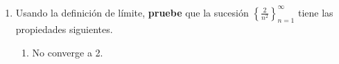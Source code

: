 \documentclass[12pt]{article}
\begin{document}
\begin{enumerate}
\begin{proof}
\begin{enumerate}
\begin{equation*}
                    1^2+2^2+\cdots+n^2=\frac{n(n+1)(2n+1)}{2}
                \end{equation*}
                de esta forma
                \begin{equation*}
                    \frac{1^2+2^2+\cdots+n^2}{n^3}=\frac{n(n+1)(2n+1)}{2n^3}
                \end{equation*}
                reescribiendo de forma apropiada se obtiene que
                \begin{equation*}
                    \begin{split}
                        \frac{n(n+1)(2n+1)}{2n^3}=&\frac{n(2n^2+3n+1)}{2n^3}\\
                        =&\frac{2n^3+3n^2+n}{2n^3}\\
                        =&1+\frac{3}{2n}+\frac{1}{2n^2}\\
                        =&1+\frac{3}{2}\cdot\frac{1}{n}+\frac{1}{2}\cdot\frac{1}{n^2}\\
                    \end{split}
                \end{equation*}
                por tanto
                \begin{equation*}
                    \begin{split}
                        \lim_{n\rightarrow\infty}\frac{1^2+2^2+\cdots+n^2}{n^3}=&\lim_{n\rightarrow\infty}\left(1+\frac{3}{2}\cdot\frac{1}{n}+\frac{1}{2}\cdot\frac{1}{n^2}\right)\\
                        =&\lim_{n\rightarrow\infty}1+\lim_{n\rightarrow\infty}\frac{3}{2}\cdot\frac{1}{n}+\lim_{n\rightarrow\infty}\frac{1}{2}\cdot\frac{1}{n^2}\\
                        =&1+\frac{3}{2}\cdot\lim_{n\rightarrow\infty}\frac{1}{n}+\frac{1}{2}\cdot\lim_{n\rightarrow\infty}\frac{1}{n^2}\\
                        =&1\\
                    \end{split}
                \end{equation*}
                \item 
                \qed
            \end{enumerate}
        \end{proof}
    \item Usando la definición de límite, \textbf{pruebe} que la sucesión $\left\{\frac{2}{n^2}\right\}_{n=1}^{\infty}$ tiene las propiedades siguientes.
        \begin{enumerate}
            \item No converge a 2.
                

\end{enumerate}
\end{enumerate}
\end{document}
